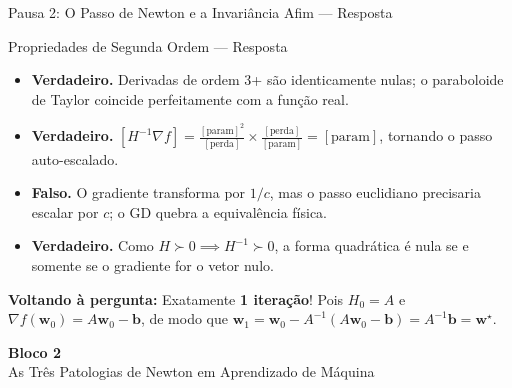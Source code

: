 \documentclass[aspectratio=169, 10pt]{beamer}
\newenvironment{callouttip}[1][Dica]{%
  \begin{exampleblock}{#1}%
}{%
  \end{exampleblock}%
}
\newcommand{\cmark}{\textcolor{green!60!black}{\textbf{\ding{51}}}}
\newcommand{\xmark}{\textcolor{red!70!black}{\textbf{\ding{55}}}}
\begin{document}
\begin{frame}{Pausa 2: O Passo de Newton e a Invariância Afim --- Resposta}
  \begin{callouttip}[Propriedades de Segunda Ordem --- Resposta]
    \begin{itemize}
      \item[\cmark] \textbf{Verdadeiro.} Derivadas de ordem 3+ são identicamente nulas; o paraboloide de Taylor coincide perfeitamente com a função real.
      \item[\cmark] \textbf{Verdadeiro.} $[H^{-1}\nabla f] = \frac{[\text{param}]^2}{[\text{perda}]} \times \frac{[\text{perda}]}{[\text{param}]} = [\text{param}]$, tornando o passo auto-escalado.
      \item[\xmark] \textbf{Falso.} O gradiente transforma por $1/c$, mas o passo euclidiano precisaria escalar por $c$; o GD quebra a equivalência física.
      \item[\cmark] \textbf{Verdadeiro.} Como $H \succ 0 \implies H^{-1} \succ 0$, a forma quadrática é nula se e somente se o gradiente for o vetor nulo.
    \end{itemize}
  \end{callouttip}
  \vspace{0.2cm}
  \textbf{Voltando à pergunta:} Exatamente \textbf{1 iteração}! Pois $H_0 = A$ e $\nabla f(\mathbf{w}_0) = A \mathbf{w}_0 - \mathbf{b}$, de modo que $\mathbf{w}_1 = \mathbf{w}_0 - A^{-1}(A \mathbf{w}_0 - \mathbf{b}) = A^{-1}\mathbf{b} = \mathbf{w}^\star$.
\end{frame}

\begin{frame}[plain]
  \centering
  \vspace{2cm}
  {\Huge \textcolor{unicampblue}{\textbf{Bloco 2}}}\\
  \vspace{0.5cm}
  {\large \textcolor{unicampteal}{As Três Patologias de Newton em Aprendizado de Máquina}}
\end{frame}
\end{document}
